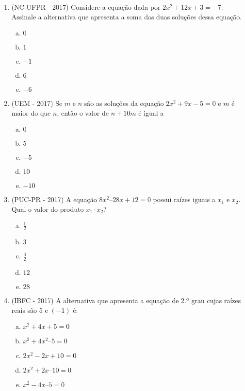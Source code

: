\begin{enumerate}
 \item (NC-UFPR - 2017) Considere a equação dada por $2x^2 + 12x + 3 = -7$. Assinale a alternativa que apresenta a soma das duas soluções dessa equação.
 \begin{multicols}{5}
 \begin{enumerate}[a)]
 \item $0$
 \item $1$
 \item $-1$
 \item $6$
 \item $-6$
 \end{enumerate}
 \end{multicols}
 
 \item (UEM - 2017) Se $m$ e $n$ são as soluções da equação  $2x^2 +9x - 5 = 0$  e $m$ é maior do que $n$, então o valor de $n +10m$ é igual a
 \begin{multicols}{5}
 \begin{enumerate}[a)]
 \item $0$
 \item $5$
 \item $-5$
 \item $10$
 \item $-10$
 \end{enumerate}
 \end{multicols}

 \item (PUC-PR - 2017) A equação $8x^2 – 28x + 12 = 0$ possui raízes iguais a $x_1$ e $x_2$. Qual o valor do produto $x_1 \cdot x_2$?
 \begin{multicols}{5}  
 \begin{enumerate}[a)]
 \item $\frac{1}{2}$
 \item $3$
 \item $\frac{3}{2}$
 \item $12$
 \item $28$
 \end{enumerate}
 \end{multicols}
 
 \item (IBFC - 2017) A alternativa que apresenta a equação de 2.º grau cujas raízes reais são $5$ e $(-1)$ é:
 \begin{enumerate}[a)]
 \item $x^2 + 4x + 5 = 0$
 \item $x^2 + 4x^2 – 5 = 0$
 \item $2x^2 - 2x + 10 = 0$
 \item $2x^2 + 2x – 10 = 0$
 \item $x^2 - 4x – 5 = 0$
 \end{enumerate}
 

\end{enumerate}
